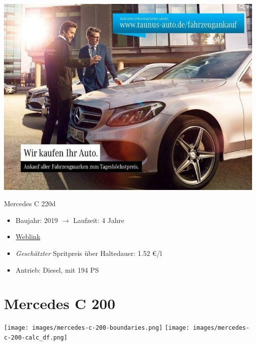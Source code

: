 \documentclass[landscape, DIV=99, 14pt]{scrartcl}
\begin{document}
\pagebreak
\null
\vspace{2cm}
\begin{center}
\includegraphics[width=0.9\columnwidth]{cars/mercedes-c-220d-t.png}

Mercedes C 220d
\end{center}

\begin{itemize}
    \item Baujahr: 2019 $\rightarrow$ Laufzeit: 4 Jahre
    \item \href{https://suchen.mobile.de/fahrzeuge/details.html?action=parkItem&id=336723447}{Weblink}
    \item \emph{Gesch\"atzter} Spritpreis \"uber Haltedauer: 1.52 \euro{}/l
    \item Antrieb: Diesel, mit 194 PS
\end{itemize}

\pagebreak


\twocolumn

\section*{Mercedes C 200}
\begin{center}
\texttt{[image: images/mercedes-c-200-boundaries.png]}
\null
\vspace{0.5cm}
\texttt{[image: images/mercedes-c-200-calc\_df.png]}
\end{center}
\end{document}
